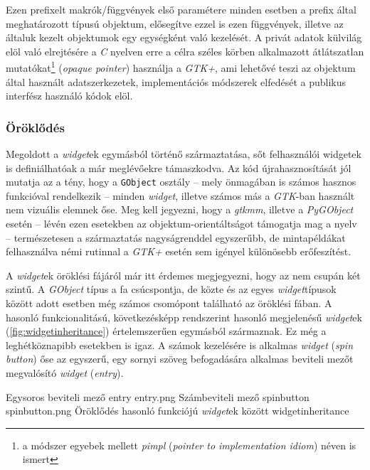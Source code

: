 Ezen prefixelt makrók/függvények első paramétere minden esetben a prefix által meghatározott típusú objektum, elősegítve ezzel is ezen függvények, illetve az általuk kezelt objektumok egy egységként való kezelését. A privát adatok külvilág elöl való elrejtésére a \textit{C} nyelven erre a célra széles körben alkalmazott átlátszatlan mutatókat\footnote{a módszer egyebek mellett \textit{pimpl} (\textit{pointer to implementation idiom}) néven is ismert} (\textit{opaque pointer}) használja a \textit{GTK+}, ami lehetővé teszi az objektum által használt adatszerkezetek, implementációs módszerek elfedését a publikus interfész használó kódok elöl.

\subsubsection{Öröklődés}

Megoldott a \textit{widget}ek egymásból történő származtatása, sőt felhasználói widgetek is definiálhatóak a már meglévőekre támaszkodva. Az kód újrahasznosítását jól mutatja az a tény, hogy a \texttt{GObject} osztály -- mely önmagában is számos hasznos funkcióval rendelkezik -- minden \textit{widget}, illetve számos  más a \textit{GTK}-ban használt nem vizuális elemnek őse. Meg kell jegyezni, hogy a \textit{gtkmm}, illetve a \textit{PyGObject} esetén -- lévén ezen esetekben az objektum-orientáltságot támogatja mag a nyelv -- természetesen a származtatás nagyságrenddel egyszerűbb, de mintapéldákat felhasználva némi rutinnal a \textit{GTK+} esetén sem igényel különösebb erőfeszítést.

A \textit{widget}ek öröklési fájáról már itt érdemes megjegyezni, hogy az nem csupán két szintű. A \textit{GObject} típus a fa csúcspontja, de közte és az egyes \textit{widget}típusok között adott esetben még számos csomópont található az öröklési fában. A hasonló funkcionalitású, következésképp rendszerint hasonló megjelenésű \textit{widget}ek (\ref{fig:widgetinheritance}) értelemszerűen egymásból származnak. Ez még a leghétköznapibb esetekben is igaz. A számok kezelésére is alkalmas \textit{widget} (\textit{spin button}) őse az egyszerű, egy sornyi szöveg befogadására alkalmas beviteli mezőt megvalósító \textit{widget} (\textit{entry}).

{Egysoros beviteli mező}
{entry}
{entry.png}
{Számbeviteli mező}
{spinbutton}
{spinbutton.png}
{Öröklődés hasonló funkciójú \textit{widget}ek között}
{widgetinheritance}


